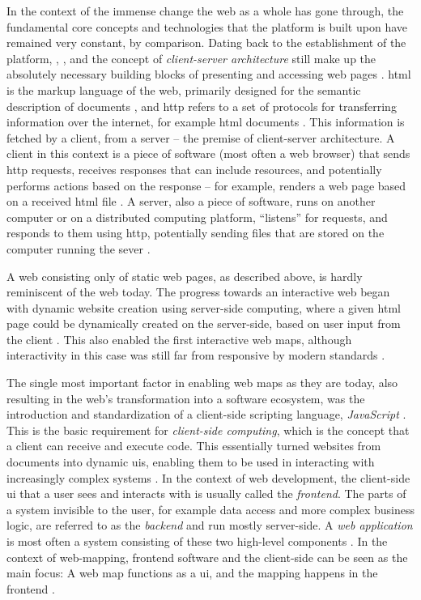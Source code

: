 In the context of the immense change the web as a whole has gone through,
the fundamental core concepts and technologies that the platform is built upon
have remained very constant, by comparison.
Dating back to the establishment of the platform,
, , and the concept of
\textit{client-server architecture}
still make up the absolutely necessary building blocks
of presenting and accessing web pages \parencite{ber1994, tai2017}.
\acrshort{html} is the markup language of the web,
primarily designed for the semantic description of documents \parencite{w3chtml},
and \acrshort{http} refers to a set of protocols for transferring information over the internet,
for example \acrshort{html} documents \parencite{ietfhttp1, ietfhttp2, ietfhttp3}.
This information is fetched by a client, from a server --
the premise of client-server architecture.
A client in this context is
a piece of software (most often a web browser) that sends \acrshort{http} requests,
receives responses that can include resources,
and potentially performs actions based on the response --
for example, renders a web page based on a received \acrshort{html} file
\parencite{sac2017}.
A server, also a piece of software,
runs on another computer or on a distributed computing platform,
\enquote{listens} for requests,
and responds to them using \acrshort{http},
potentially sending files that are stored on the computer running the sever
\parencite{sac2017}.

A web consisting only of static web pages, as described above,
is hardly reminiscent of the web today.
The progress towards an interactive web began with
dynamic website creation using server-side computing,
where a given \acrshort{html} page could be dynamically created on the server-side,
based on user input from the client \parencite{jac2019}.
This also enabled the first interactive web maps,
although interactivity in this case was still
far from responsive by modern standards \parencite{vee2017}.

The single most important factor in enabling web maps as they are today,
also resulting in the web's transformation into a software ecosystem,
was the introduction and standardization of a client-side scripting language,
\textit{JavaScript} \parencite{cho2014, vee2017}.
This is the basic requirement for \textit{client-side computing},
which is the concept that a client can
receive and execute code.
This essentially turned websites from documents
into dynamic \acrshort{ui}s, enabling them to be used
in interacting with increasingly complex systems \parencite{jac2019}.
In the context of web development,
the client-side \acrshort{ui} that a user sees and interacts with
is usually called the \textit{frontend}.
The parts of a system invisible to the user,
for example data access and more complex business logic,
are referred to as the \textit{backend} and run mostly server-side.
A \textit{web application} is most often
a system consisting of these two high-level components \parencite{tai2017}.
In the context of web-mapping,
frontend software and the client-side can be seen as the main focus:
A web map functions as a \acrshort{ui},
and the mapping happens in the frontend
\parencite{rot2014}.

